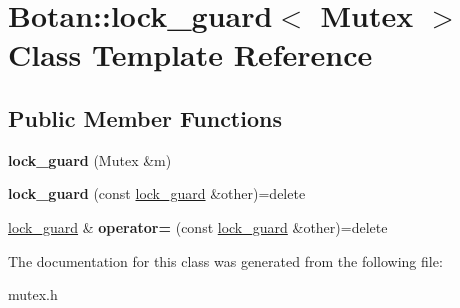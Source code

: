 \hypertarget{class_botan_1_1lock__guard}{}\section{Botan\+:\+:lock\+\_\+guard$<$ Mutex $>$ Class Template Reference}
\label{class_botan_1_1lock__guard}
\subsection*{Public Member Functions}
\begin{DoxyCompactItemize}
\item 
\mbox{\label{class_botan_1_1lock__guard_a0ac7297e28399f53bcec1192e31808a2}} 
{\bfseries lock\+\_\+guard} (Mutex \&m)
\item 
\mbox{\label{class_botan_1_1lock__guard_afc3d0353d360ffa3328de7030502d373}} 
{\bfseries lock\+\_\+guard} (const \hyperlink{class_botan_1_1lock__guard}{lock\+\_\+guard} \&other)=delete
\item 
\mbox{\label{class_botan_1_1lock__guard_a32a1e4aced30e938f8cd12d63c57a46a}} 
\hyperlink{class_botan_1_1lock__guard}{lock\+\_\+guard} \& {\bfseries operator=} (const \hyperlink{class_botan_1_1lock__guard}{lock\+\_\+guard} \&other)=delete
\end{DoxyCompactItemize}


The documentation for this class was generated from the following file\+:\begin{DoxyCompactItemize}
\item 
mutex.\+h\end{DoxyCompactItemize}
